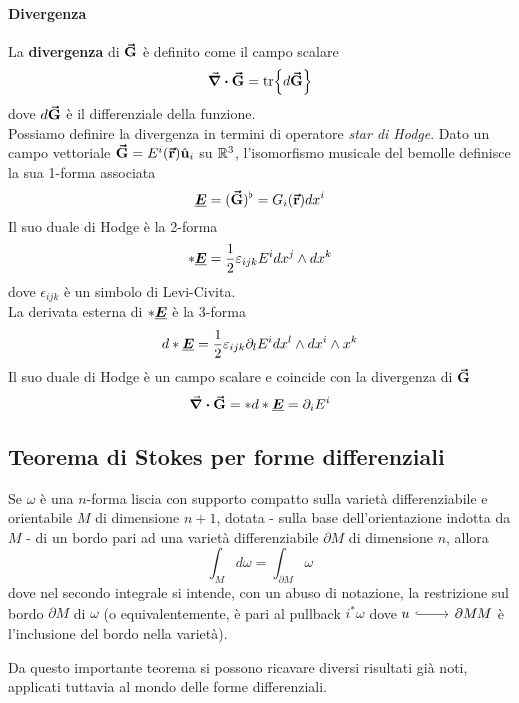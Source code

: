 \paragraph{Divergenza}
La \textbf{divergenza} di $\vb*{\va{G}}$ è definito come il campo scalare
\begin{equation}
	\div{\vb*{\va{G}}}=\tr{d\vb*{\va{G}}}
\end{equation}
dove $d\vb*{\va{G}}$ è il differenziale della funzione.\\
Possiamo definire la divergenza in termini di operatore \textit{star di Hodge}. Dato un campo vettoriale $\vb*{\va{G}}=E^i(\vb*{\va{r}})\hat{\mathbf{u}}_i$ su $\mathbb{R}^3$, l'isomorfismo musicale del bemolle definisce la sua 1-forma associata
\begin{equation*}
	\vb*{\underline{E}}=(\vb*{\va{G}})^\flat=G_i(\vb*{\va{r}})dx^i
\end{equation*}
Il suo duale di Hodge è la 2-forma
\begin{equation*}
	\ast\vb*{\underline{E}}=\frac{1}{2}\varepsilon_{ijk}E^idx^j\wedge dx^k
\end{equation*}
dove $\epsilon_{ijk}$ è un simbolo di Levi-Civita.\\
La derivata esterna di $\ast\vb*{\underline{E}}$ è la 3-forma
\begin{equation*}
	d\ast\vb*{\underline{E}}=\frac{1}{2}\varepsilon_{ijk}\partial_lE^idx^{l}\wedge dx^i\wedge x^k
\end{equation*}
Il suo duale di Hodge è un campo scalare e coincide con la divergenza di $\vb*{\va{G}}$  
\begin{equation}
	\div{\vb*{\va{G}}}=\ast d\ast\vb*{\underline{E}}=\partial_i E^i
\end{equation}
\subsection{Teorema di Stokes per forme differenziali}
\begin{theoremaqed}
	Se $\omega$ è una $n$-forma liscia con supporto compatto sulla varietà differenziabile e orientabile $M$ di dimensione $n+1$, dotata - sulla base dell'orientazione indotta da $M$ - di un bordo pari ad una varietà differenziabile $\partial M$ di dimensione $n$, allora
	\begin{equation*}
		\int_{M}d\omega=\int_{\partial M}\omega
	\end{equation*}
dove nel secondo integrale si intende, con un abuso di notazione, la restrizione sul bordo $\partial M$ di $\omega$ (o equivalentemente, è pari al pullback $i^{\ast}\omega$ dove $\incl{u}{\partial M}{M}$ è l'inclusione del bordo nella varietà).
\end{theoremaqed}
Da questo importante teorema si possono ricavare diversi risultati già noti, applicati tuttavia al mondo delle forme differenziali.
